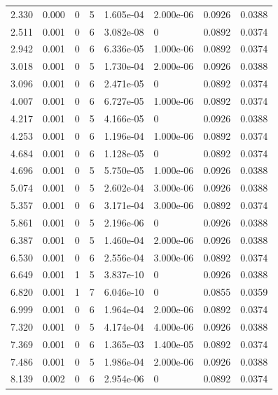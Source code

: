 \documentclass[preview]{standalone}
\begin{document}
{{\begin{tabular}{L{1.2cm}C{1.2cm} C{0.3cm}C{0.5cm} C{1.4cm}C{1.4cm} C{1.4cm}C{1.4cm}}
  2.330  &  0.000  & 0     &  5 &  1.605e-04  & 2.000e-06  & 0.0926 &  0.0388   \\ 
  2.511  &  0.001  & 0     &  6 &  3.082e-08  & 0  & 0.0892 &  0.0374   \\ 
  2.942  &  0.001  & 0     &  6 &  6.336e-05  & 1.000e-06  & 0.0892 &  0.0374   \\ 
  3.018  &  0.001  & 0     &  5 &  1.730e-04  & 2.000e-06  & 0.0926 &  0.0388   \\ 
  3.096  &  0.001  & 0     &  6 &  2.471e-05  & 0  & 0.0892 &  0.0374   \\ 
  4.007  &  0.001  & 0     &  6 &  6.727e-05  & 1.000e-06  & 0.0892 &  0.0374   \\ 
  4.217  &  0.001  & 0     &  5 &  4.166e-05  & 0  & 0.0926 &  0.0388   \\ 
  4.253  &  0.001  & 0     &  6 &  1.196e-04  & 1.000e-06  & 0.0892 &  0.0374   \\ 
  4.684  &  0.001  & 0     &  6 &  1.128e-05  & 0  & 0.0892 &  0.0374   \\ 
  4.696  &  0.001  & 0     &  5 &  5.750e-05  & 1.000e-06  & 0.0926 &  0.0388   \\ 
  5.074  &  0.001  & 0     &  5 &  2.602e-04  & 3.000e-06  & 0.0926 &  0.0388   \\ 
  5.357  &  0.001  & 0     &  6 &  3.171e-04  & 3.000e-06  & 0.0892 &  0.0374   \\ 
  5.861  &  0.001  & 0     &  5 &  2.196e-06  & 0  & 0.0926 &  0.0388   \\ 
  6.387  &  0.001  & 0     &  5 &  1.460e-04  & 2.000e-06  & 0.0926 &  0.0388   \\ 
  6.530  &  0.001  & 0     &  6 &  2.556e-04  & 3.000e-06  & 0.0892 &  0.0374   \\ 
  6.649  &  0.001  & 1     &  5 &  3.837e-10  & 0  & 0.0926 &  0.0388   \\ 
  6.820  &  0.001  & 1     &  7 &  6.046e-10  & 0  & 0.0855 &  0.0359   \\ 
  6.999  &  0.001  & 0     &  6 &  1.964e-04  & 2.000e-06  & 0.0892 &  0.0374   \\ 
  7.320  &  0.001  & 0     &  5 &  4.174e-04  & 4.000e-06  & 0.0926 &  0.0388   \\ 
  7.369  &  0.001  & 0     &  6 &  1.365e-03  & 1.400e-05  & 0.0892 &  0.0374   \\ 
  7.486  &  0.001  & 0     &  5 &  1.986e-04  & 2.000e-06  & 0.0926 &  0.0388   \\ 
  8.139  &  0.002  & 0     &  6 &  2.954e-06  & 0  & 0.0892 &  0.0374   \\ 

\end{tabular}}}
\end{document}
